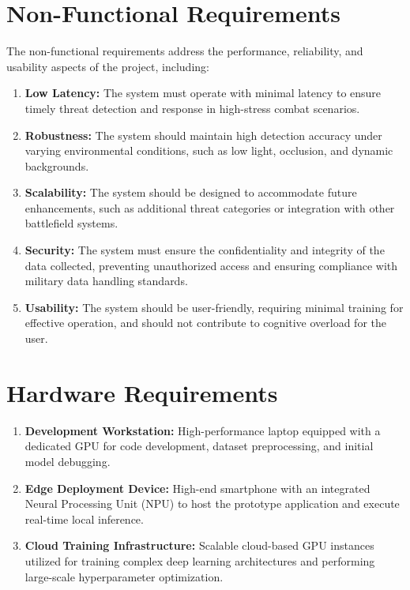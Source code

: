\section{Non-Functional Requirements}
The non-functional requirements address the performance, reliability, and usability aspects of the project, including:
\begin{enumerate}[label=\roman*.]
    \item \textbf{Low Latency:} The system must operate with minimal latency to ensure timely threat detection and response in high-stress combat scenarios.
    \item \textbf{Robustness:} The system should maintain high detection accuracy under varying environmental conditions, such as low light, occlusion, and dynamic backgrounds.
    \item \textbf{Scalability:} The system should be designed to accommodate future enhancements, such as additional threat categories or integration with other battlefield systems.
    \item \textbf{Security:} The system must ensure the confidentiality and integrity of the data collected, preventing unauthorized access and ensuring compliance with military data handling standards.
    \item \textbf{Usability:} The system should be user-friendly, requiring minimal training for effective operation, and should not contribute to cognitive overload for the user.
\end{enumerate}

\section{Hardware Requirements}
\begin{enumerate}[label=\roman*.]
    \item \textbf{Development Workstation:} High-performance laptop equipped with a dedicated GPU for code development, dataset preprocessing, and initial model debugging.
    \item \textbf{Edge Deployment Device:} High-end smartphone with an integrated Neural Processing Unit (NPU) to host the prototype application and execute real-time local inference.
    \item \textbf{Cloud Training Infrastructure:} Scalable cloud-based GPU instances utilized for training complex deep learning architectures and performing large-scale hyperparameter optimization.
\end{enumerate}

